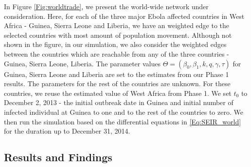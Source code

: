 \documentclass[10pt, journal,onecolumn]{IEEEtran}
\begin{document}
In Figure \ref{Fig:worldtrade}, we present the world-wide network under consideration. Here, for
each of the three major Ebola affected countries in West Africa - Guinea, Sierra Leone and Liberia,
we have an weighted edge to the selected countries with most amount of population movement. Although
not shown in the figure, in our simulation, we also consider the weighted edges between the
countries which are reachable from any of the three countries -  Guinea, Sierra Leone,  Liberia.
The parameter values $\Theta=(\beta_0,\beta_1,k,q,\gamma, \tau)$ for Guinea, Sierra Leone and Liberia
are set to the estimates from our Phase 1 results. The parameters for the rest of the countries are unknown. For
these countries, we reuse the estimated value of West Africa from Phase 1. We
set $t_0$ to December 2, 2013 - the initial outbreak date in Guinea and initial number of infected
individual at Guinea to one and to the rest of the countries to zero. We then run the simulation
based on the differential equations in \eqref{Eq:SEIR_world} for the duration up to December 31,
2014.

\subsection{Results and Findings}
\label{SubSec:WorldResult}
\end{document}
